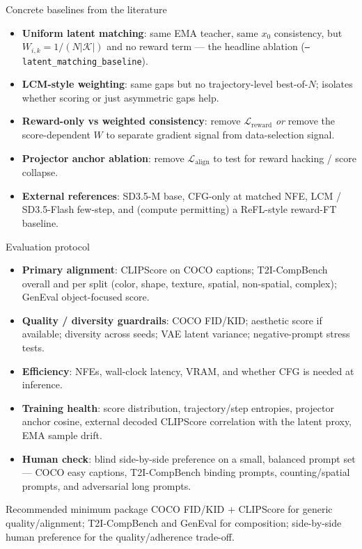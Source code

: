 \documentclass[aspectratio=169,10pt]{beamer}
\begin{document}
\begin{frame}{Concrete baselines from the literature}
  \begin{itemize}
    \item \textbf{Uniform latent matching}: same EMA teacher, same $x_0$
      consistency, but $W_{i,k}=1/(N|\mathcal{K}|)$ and no reward term ---
      the headline ablation (\texttt{--latent\_matching\_baseline}).
    \item \textbf{LCM-style weighting}: same gaps but no trajectory-level
      best-of-$N$; isolates whether scoring or just asymmetric gaps help.
    \item \textbf{Reward-only vs weighted consistency}: remove
      $\mathcal{L}_{\mathrm{reward}}$ \emph{or} remove the score-dependent $W$
      to separate gradient signal from data-selection signal.
    \item \textbf{Projector anchor ablation}: remove $\mathcal{L}_{\mathrm{align}}$
      to test for reward hacking / score collapse.
    \item \textbf{External references}: SD3.5-M base, CFG-only at matched NFE,
      LCM / SD3.5-Flash few-step, and (compute permitting) a ReFL-style
      reward-FT baseline.
  \end{itemize}
\end{frame}

\begin{frame}{Evaluation protocol}
  \footnotesize
  \begin{itemize}
    \item \textbf{Primary alignment}: CLIPScore on COCO captions;
      T2I-CompBench overall and per split (color, shape, texture, spatial,
      non-spatial, complex); GenEval object-focused score.
    \item \textbf{Quality / diversity guardrails}: COCO FID/KID; aesthetic
      score if available; diversity across seeds; VAE latent variance;
      negative-prompt stress tests.
    \item \textbf{Efficiency}: NFEs, wall-clock latency, VRAM, and whether
      CFG is needed at inference.
    \item \textbf{Training health}: score distribution, trajectory/step
      entropies, projector anchor cosine, external decoded CLIPScore
      correlation with the latent proxy, EMA sample drift.
    \item \textbf{Human check}: blind side-by-side preference on a small,
      balanced prompt set --- COCO easy captions, T2I-CompBench binding
      prompts, counting/spatial prompts, and adversarial long prompts.
  \end{itemize}
  \begin{block}{Recommended minimum package}
    COCO FID/KID $+$ CLIPScore for generic quality/alignment; T2I-CompBench
    and GenEval for composition; side-by-side human preference for the
    quality/adherence trade-off.
  \end{block}
\end{frame}
\end{document}
